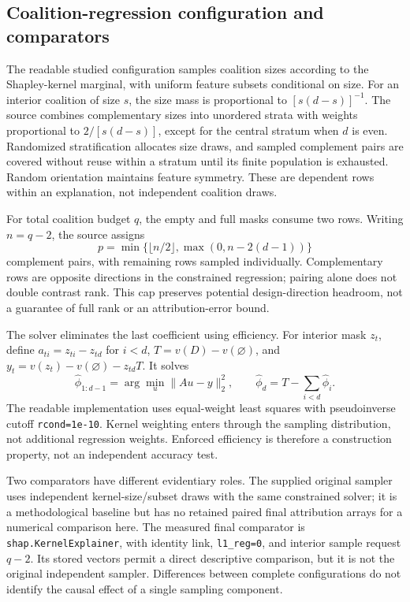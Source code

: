 \documentclass{article}
\begin{document}
\subsection{Coalition-regression configuration and comparators}
The readable studied configuration samples coalition sizes according to the Shapley-kernel marginal, with uniform feature subsets conditional on size. For an interior coalition of size $s$, the size mass is proportional to $[s(d-s)]^{-1}$. The source combines complementary sizes into unordered strata with weights proportional to $2/[s(d-s)]$, except for the central stratum when $d$ is even. Randomized stratification allocates size draws, and sampled complement pairs are covered without reuse within a stratum until its finite population is exhausted. Random orientation maintains feature symmetry. These are dependent rows within an explanation, not independent coalition draws.

For total coalition budget $q$, the empty and full masks consume two rows. Writing $n=q-2$, the source assigns
\begin{equation}
p=\min\{\lfloor n/2\rfloor,\max(0,n-2(d-1))\}
\label{eq:pairs}
\end{equation}
complement pairs, with remaining rows sampled individually. Complementary rows are opposite directions in the constrained regression; pairing alone does not double contrast rank. This cap preserves potential design-direction headroom, not a guarantee of full rank or an attribution-error bound.

The solver eliminates the last coefficient using efficiency. For interior mask $z_t$, define $a_{ti}=z_{ti}-z_{td}$ for $i<d$, $T=v(D)-v(\varnothing)$, and $y_t=v(z_t)-v(\varnothing)-z_{td}T$. It solves
\begin{equation}
\widehat\phi_{1:d-1}=\arg\min_u\|Au-y\|_2^2,
\qquad \widehat\phi_d=T-\sum_{i<d}\widehat\phi_i.
\label{eq:regression}
\end{equation}
The readable implementation uses equal-weight least squares with pseudoinverse cutoff \texttt{rcond=1e-10}. Kernel weighting enters through the sampling distribution, not additional regression weights. Enforced efficiency is therefore a construction property, not an independent accuracy test.

Two comparators have different evidentiary roles. The supplied original sampler uses independent kernel-size/subset draws with the same constrained solver; it is a methodological baseline but has no retained paired final attribution arrays for a numerical comparison here. The measured final comparator is \texttt{shap.KernelExplainer}, with identity link, \texttt{l1\_reg=0}, and interior sample request $q-2$. Its stored vectors permit a direct descriptive comparison, but it is not the original independent sampler. Differences between complete configurations do not identify the causal effect of a single sampling component.
\end{document}
